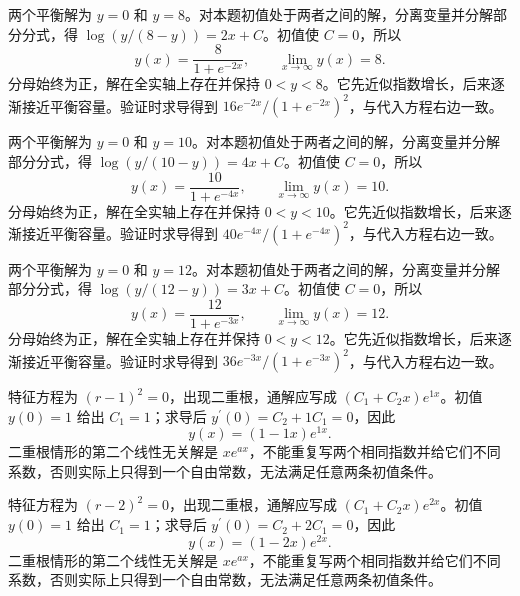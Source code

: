 \documentclass[UTF8,12pt,a4paper,fontset=fandol]{ctexart}
\begin{document}
\begin{solve}\label{ans:c23q10}
两个平衡解为 $y=0$ 和 $y=8$。对本题初值处于两者之间的解，分离变量并分解部分分式，得 $\log(y/(8-y))=2x+C$。初值使 $C=0$，所以
\[
y(x)=\frac{8}{1+e^{-2x}},\qquad\lim_{x\to\infty}y(x)=8.
\]
分母始终为正，解在全实轴上存在并保持 $0<y<8$。它先近似指数增长，后来逐渐接近平衡容量。验证时求导得到 $16e^{-2x}/(1+e^{-2x})^2$，与代入方程右边一致。
\end{solve}

\begin{solve}\label{ans:c23q11}
两个平衡解为 $y=0$ 和 $y=10$。对本题初值处于两者之间的解，分离变量并分解部分分式，得 $\log(y/(10-y))=4x+C$。初值使 $C=0$，所以
\[
y(x)=\frac{10}{1+e^{-4x}},\qquad\lim_{x\to\infty}y(x)=10.
\]
分母始终为正，解在全实轴上存在并保持 $0<y<10$。它先近似指数增长，后来逐渐接近平衡容量。验证时求导得到 $40e^{-4x}/(1+e^{-4x})^2$，与代入方程右边一致。
\end{solve}

\begin{solve}\label{ans:c23q12}
两个平衡解为 $y=0$ 和 $y=12$。对本题初值处于两者之间的解，分离变量并分解部分分式，得 $\log(y/(12-y))=3x+C$。初值使 $C=0$，所以
\[
y(x)=\frac{12}{1+e^{-3x}},\qquad\lim_{x\to\infty}y(x)=12.
\]
分母始终为正，解在全实轴上存在并保持 $0<y<12$。它先近似指数增长，后来逐渐接近平衡容量。验证时求导得到 $36e^{-3x}/(1+e^{-3x})^2$，与代入方程右边一致。
\end{solve}

\begin{solve}\label{ans:c23q13}
特征方程为 $(r-1)^2=0$，出现二重根，通解应写成 $(C_1+C_2x)e^{1x}$。初值 $y(0)=1$ 给出 $C_1=1$；求导后 $y^{\prime}(0)=C_2+1C_1=0$，因此
\[
y(x)=(1-1x)e^{1x}.
\]
二重根情形的第二个线性无关解是 $xe^{ax}$，不能重复写两个相同指数并给它们不同系数，否则实际上只得到一个自由常数，无法满足任意两条初值条件。
\end{solve}

\begin{solve}\label{ans:c23q14}
特征方程为 $(r-2)^2=0$，出现二重根，通解应写成 $(C_1+C_2x)e^{2x}$。初值 $y(0)=1$ 给出 $C_1=1$；求导后 $y^{\prime}(0)=C_2+2C_1=0$，因此
\[
y(x)=(1-2x)e^{2x}.
\]
二重根情形的第二个线性无关解是 $xe^{ax}$，不能重复写两个相同指数并给它们不同系数，否则实际上只得到一个自由常数，无法满足任意两条初值条件。
\end{solve}
\end{document}
